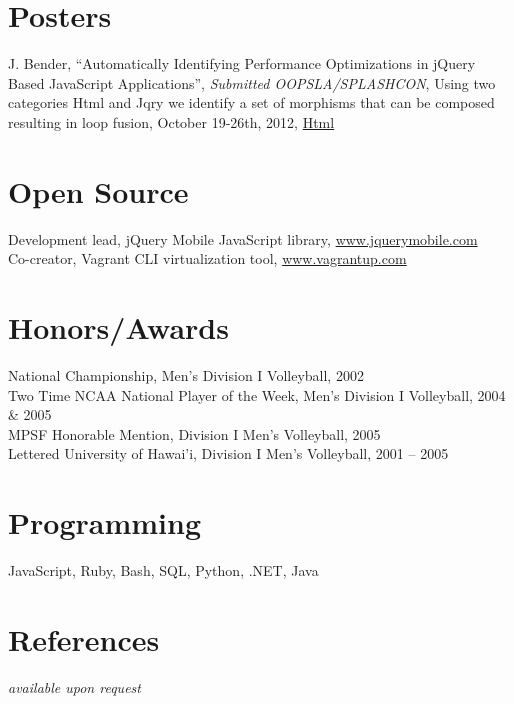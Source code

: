 \documentclass[margin,line]{resume}
\begin{document}
\begin{resume}
  \section{\mysidestyle Posters}
  J. Bender, ``Automatically Identifying Performance Optimizations in jQuery Based JavaScript Applications'', \textsl{Submitted OOPSLA/SPLASHCON}, Using two categories Html and Jqry we identify a set of morphisms that can be composed resulting in loop fusion, October 19-26th, 2012, \href{http://johnbender.github.com/auto-jquery-optimization-paper/}{Html}

  \section{\mysidestyle Open Source}

  Development lead, jQuery Mobile JavaScript library, \url{www.jquerymobile.com} \vspace{1mm}\\
  Co-creator, Vagrant CLI virtualization tool, \url{www.vagrantup.com}

  \section{\mysidestyle Honors/Awards}
  National Championship, Men's Division I Volleyball, 2002\vspace{1mm}\\
  Two Time NCAA National Player of the Week, Men's Division I Volleyball, 2004 \& 2005\vspace{1mm}\\
  MPSF Honorable Mention, Division I Men's Volleyball, 2005\vspace{1mm}\\
  Lettered University of Hawai'i, Division I Men's Volleyball, 2001 -- 2005

  \section{\mysidestyle Programming}
  JavaScript, Ruby, Bash, SQL, Python, .NET, Java

  \section{\mysidestyle References}
  \textsl{available upon request}

\end{resume}
\end{document}
